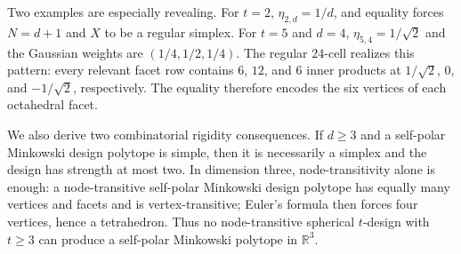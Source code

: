 \documentclass[11pt]{amsart}
\theoremstyle{definition}
\theoremstyle{remark}
\newcommand{\R}{\mathbb R}
\begin{document}
Two examples are especially revealing.  For $t=2$, $\eta_{2,d}=1/d$, and equality forces $N=d+1$ and $X$ to be a regular simplex.  For $t=5$ and $d=4$, $\eta_{5,4}=1/\sqrt2$ and the Gaussian weights are $(1/4,1/2,1/4)$.  The regular $24$-cell realizes this pattern: every relevant facet row contains $6$, $12$, and $6$ inner products at $1/\sqrt2$, $0$, and $-1/\sqrt2$, respectively.  The equality therefore encodes the six vertices of each octahedral facet.

We also derive two combinatorial rigidity consequences.  If $d\ge3$ and a self-polar Minkowski design polytope is simple, then it is necessarily a simplex and the design has strength at most two.  In dimension three, node-transitivity alone is enough: a node-transitive self-polar Minkowski design polytope has equally many vertices and facets and is vertex-transitive; Euler's formula then forces four vertices, hence a tetrahedron.  Thus no node-transitive spherical $t$-design with $t\ge3$ can produce a self-polar Minkowski polytope in $\R^3$.
\end{document}
